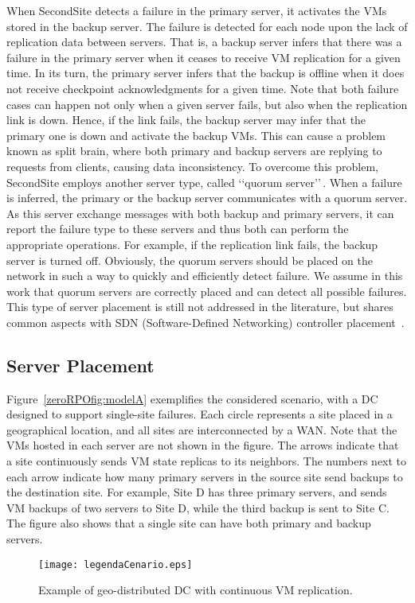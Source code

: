 \documentclass[preprint]{elsarticle}
\begin{document}
When SecondSite detects a failure in the primary server, it activates the VMs stored in the backup server.
The failure is detected for each node upon the lack of replication data between servers. That is, a backup server infers that there was a failure in the primary server when it ceases to receive VM replication for a given time. In its turn,
the primary server infers that the backup is offline when it does not receive checkpoint acknowledgments for a given time. Note that both failure cases can happen not only when a given server fails, but also when the replication link is down.
Hence, if the link fails, the backup server may infer that the primary one is down and activate the backup VMs.
This can cause a problem known as split brain, where both primary and backup servers are replying to requests from clients, causing data inconsistency.
To overcome this problem, SecondSite employs another server type, called \lq\lq quorum server\rq\rq \,.
When a failure is inferred, the primary or the backup server communicates with a quorum server.
As this server exchange messages with both backup and primary servers, it can report the failure type to these servers and thus both can perform the appropriate operations. For example, if the replication link fails, the backup server is turned off. Obviously, the quorum servers should be placed on the network in such a way to quickly and efficiently detect failure.
We assume in this work that quorum servers are correctly placed and can detect all possible failures.
This type of server placement is still not addressed in the literature, but shares common aspects with SDN (Software-Defined Networking) controller placement~\cite{muller2014survivor}.

\subsection{Server Placement}

Figure~\ref{zeroRPOfig:modelA} exemplifies the considered scenario, with a DC designed to support single-site failures. Each circle represents a site placed in a geographical location, and all sites are interconnected by a WAN. Note that the VMs hosted in each server are not shown in the figure. The arrows indicate that a site continuously sends VM state replicas to its neighbors.
The numbers next to each arrow indicate how many primary servers in the source site send backups to the destination site. For example, Site D has three primary servers, and sends VM backups of two servers to Site D, while the third backup is sent to Site C. The figure also shows that a single site can have both primary and backup servers. 
\begin{figure}
\centering
{\texttt{[image: legendaCenario.eps]}}\\
\caption{Example of geo-distributed DC with continuous VM replication.}
\label{zeroRPOfig:model}
\end{figure}
\end{document}
